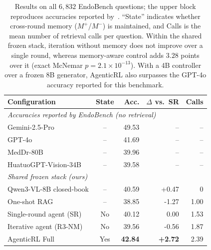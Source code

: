 \begin{table}[t]
  \centering
  \small
  \begin{tabular}{lcrrr}
    \toprule
    Configuration & State & Acc. & $\Delta$ vs.\ SR & Calls \\
    \midrule
    \multicolumn{5}{l}{\emph{Accuracies reported by EndoBench (no retrieval)}}\\
    Gemini-2.5-Pro & -- & 49.53 & -- & -- \\
    GPT-4o & -- & 41.69 & -- & -- \\
    MedDr-80B & -- & 39.96 & -- & -- \\
    HuatuoGPT-Vision-34B & -- & 39.58 & -- & -- \\
    \midrule
    \multicolumn{5}{l}{\emph{Shared frozen stack (ours)}}\\
    Qwen3-VL-8B closed-book & -- & 40.59 & +0.47 & 0 \\
    One-shot RAG & -- & 38.85 & -1.27 & 1.00 \\
    Single-round agent (SR) & No & 40.12 & \phantom{+}0.00 & 1.53 \\
    Iterative agent (R3-NM) & No & 39.56 & -0.56 & 1.87 \\
    AgenticRL Full & Yes & \textbf{42.84} & \textbf{+2.72} & 2.39 \\
    \bottomrule
  \end{tabular}
  \caption{Results on all $6{,}832$ EndoBench questions; the upper block
  reproduces accuracies reported by~\citet{liu2025endobench}. ``State''
  indicates whether cross-round memory ($M^+$/$M^-$) is maintained, and Calls is
  the mean number of retrieval calls per question. Within the shared frozen
  stack, iteration without memory does not improve over a single round, whereas
  memory-aware control adds $3.28$ points over it (exact McNemar
  $p=2.1\times10^{-13}$). With a 4B controller over a frozen 8B generator,
  AgenticRL also surpasses the GPT-4o accuracy reported for this benchmark.}
  \label{tab:main}
\end{table}

